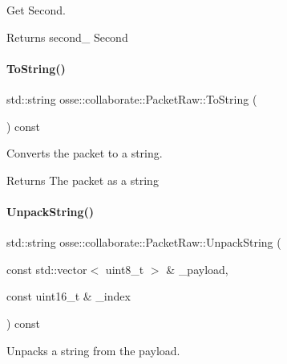 Get Second. 

\begin{DoxyReturn}{Returns}
second\+\_\+ Second 
\end{DoxyReturn}
\mbox{\label{classosse_1_1collaborate_1_1_packet_raw_a838d1364ab1defdff4abcabf5369827a}} 
\paragraph{\texorpdfstring{To\+String()}{ToString()}}
{\footnotesize\ttfamily std\+::string osse\+::collaborate\+::\+Packet\+Raw\+::\+To\+String (\begin{DoxyParamCaption}{ }\end{DoxyParamCaption}) const}



Converts the packet to a string. 

\begin{DoxyReturn}{Returns}
The packet as a string 
\end{DoxyReturn}
\mbox{\label{classosse_1_1collaborate_1_1_packet_raw_a852c9461111a6dff32bf1374d8bf27e0}} 
\paragraph{\texorpdfstring{Unpack\+String()}{UnpackString()}}
{\footnotesize\ttfamily std\+::string osse\+::collaborate\+::\+Packet\+Raw\+::\+Unpack\+String (\begin{DoxyParamCaption}\item[{const std\+::vector$<$ uint8\+\_\+t $>$ \&}]{\+\_\+payload,  }\item[{const uint16\+\_\+t \&}]{\+\_\+index }\end{DoxyParamCaption}) const\hspace{0.3cm}{\ttfamily [private]}}



Unpacks a string from the payload. 


